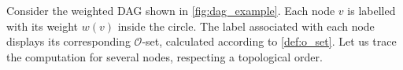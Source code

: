 \begin{example}
    \label{ex:o_set_calc}
    Consider the weighted DAG shown in \autoref{fig:dag_example}. Each node $v$ is labelled with its weight $w(v)$ inside the circle. The label associated with each node displays its corresponding $\mathcal{O}$-set, calculated according to \ref{def:o_set}. Let us trace the computation for several nodes, respecting a topological order.


\end{example}
